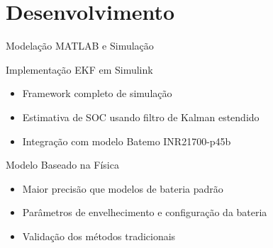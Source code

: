 \documentclass[aspectratio=169,xcolor=dvipsnames]{beamer}
\begin{document}
\section{Desenvolvimento}
\begin{frame}{Modelação MATLAB e Simulação}
  \begin{block}{Implementação EKF em Simulink}
    \begin{itemize}
      \item Framework completo de simulação
      \item Estimativa de SOC usando filtro de Kalman estendido
      \item Integração com modelo Batemo INR21700-p45b
    \end{itemize}
  \end{block}
  
  \begin{exampleblock}{Modelo Baseado na Física}
    \begin{itemize}
      \item Maior precisão que modelos de bateria padrão
      \item Parâmetros de envelhecimento e configuração da bateria
      \item Validação dos métodos tradicionais
    \end{itemize}
  \end{exampleblock}
\end{frame}
\end{document}
